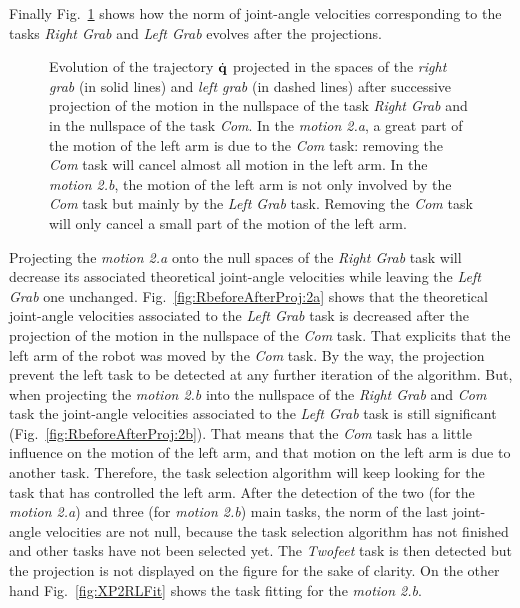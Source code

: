 \documentclass[letterpaper, 10pt, conference]{ieeeconf}      %
\begin{document}
Finally Fig.~\ref{fig:RbeforeAfterProj} shows how the norm of joint-angle velocities corresponding to the tasks
\emph{Right Grab} and \emph{Left Grab} evolves after the projections.
\begin{figure}[t]
\centering
  \subfigure[Motion 2.a]{
  \resizebox{.48\textwidth}{!} {
      
    }
  \label{fig:RbeforeAfterProj:2a}
  }
  \subfigure[Motion 2.b]{
  \resizebox{.48\textwidth}{!} {
      
  }
  \label{fig:RbeforeAfterProj:2b}
  }
  \caption{Evolution of the trajectory $\dot{{\mathbf{q}}}$ projected in the spaces of
  the \emph{right grab} (in solid lines) and 
  \emph{left grab} (in dashed lines) after
  successive projection of the motion in the nullspace of the task \emph{Right Grab} and in the nullspace
  of the task \emph{Com}. In the \emph{motion 2.a}, a great part of the motion of the left arm is due to 
  the \emph{Com} task: removing the \emph{Com} task will cancel almost all motion in the left arm.
  In the \emph{motion 2.b}, the motion of the left arm is not only involved by the \emph{Com} task
  but mainly by the \emph{Left Grab} task. Removing the \emph{Com} task will only
  cancel a small part of the motion of the left arm.}
\label{fig:RbeforeAfterProj}
\end{figure}
Projecting the \emph{motion 2.a} onto the null spaces of
the \emph{Right Grab} task will decrease its associated theoretical joint-angle velocities while leaving the
\emph{Left Grab} one unchanged. Fig.~\ref{fig:RbeforeAfterProj:2a} shows
that the theoretical joint-angle velocities associated to the
\emph{Left Grab} task is decreased after the projection of the motion in
the nullspace of the \emph{Com} task.  That explicits that
the left arm of the robot was moved by the \emph{Com} task.
By the way, the projection prevent the left task to be detected at any further iteration of
the algorithm.
But, when projecting the \emph{motion 2.b} into the nullspace of the \emph{Right Grab}
and \emph{Com} task the joint-angle velocities associated to the \emph{Left Grab} task
is still significant (Fig.~\ref{fig:RbeforeAfterProj:2b}). That means that the
\emph{Com} task has a little influence on the
motion of the left arm, and that motion on the left arm is due
to another task. Therefore, the task selection algorithm will keep looking
for the task that has controlled the left arm.
After the detection of the two (for the \emph{motion 2.a}) and three (for \emph{motion 2.b}) main tasks,
the norm of the last joint-angle velocities are not null, because 
the task selection algorithm has not finished and other tasks have not been selected yet.
The \emph{Twofeet} task is then detected but the projection is not displayed on the figure for the sake of clarity.
On the other hand Fig.~\ref{fig:XP2RLFit} shows the task fitting for the \emph{motion 2.b}.
\end{document}
